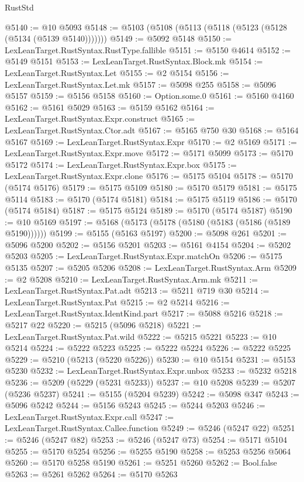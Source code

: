 \begin{lexlean}{RustStd}
\begin{coremodule}
@5140 := @10 @5093
@5148 := @5103 (@5108 (@5113 (@5118 (@5123 (@5128 (@5134 (@5139 @5140)))))))
@5149 := @5092 @5148
@5150 := LexLeanTarget.RustSyntax.RustType.fallible
@5151 := @5150 @4614
@5152 := @5149 @5151
@5153 := LexLeanTarget.RustSyntax.Block.mk
@5154 := LexLeanTarget.RustSyntax.Let
@5155 := @2 @5154
@5156 := LexLeanTarget.RustSyntax.Let.mk
@5157 := @5098 @255
@5158 := @5096 @5157
@5159 := @5156 @5158
@5160 := Option.some.{0}
@5161 := @5160 @4160
@5162 := @5161 @5029
@5163 := @5159 @5162
@5164 := LexLeanTarget.RustSyntax.Expr.construct
@5165 := LexLeanTarget.RustSyntax.Ctor.adt
@5167 := @5165 @750 @30
@5168 := @5164 @5167
@5169 := LexLeanTarget.RustSyntax.Expr
@5170 := @2 @5169
@5171 := LexLeanTarget.RustSyntax.Expr.move
@5172 := @5171 @5099
@5173 := @5170 @5172
@5174 := LexLeanTarget.RustSyntax.Expr.box
@5175 := LexLeanTarget.RustSyntax.Expr.clone
@5176 := @5175 @5104
@5178 := @5170 (@5174 @5176)
@5179 := @5175 @5109
@5180 := @5170 @5179
@5181 := @5175 @5114
@5183 := @5170 (@5174 @5181)
@5184 := @5175 @5119
@5186 := @5170 (@5174 @5184)
@5187 := @5175 @5124
@5189 := @5170 (@5174 @5187)
@5190 := @10 @5169
@5197 := @5168 (@5173 (@5178 (@5180 (@5183 (@5186 (@5189 @5190))))))
@5199 := @5155 (@5163 @5197)
@5200 := @5098 @261
@5201 := @5096 @5200
@5202 := @5156 @5201
@5203 := @5161 @4154
@5204 := @5202 @5203
@5205 := LexLeanTarget.RustSyntax.Expr.matchOn
@5206 := @5175 @5135
@5207 := @5205 @5206
@5208 := LexLeanTarget.RustSyntax.Arm
@5209 := @2 @5208
@5210 := LexLeanTarget.RustSyntax.Arm.mk
@5211 := LexLeanTarget.RustSyntax.Pat.adt
@5213 := @5211 @719 @30
@5214 := LexLeanTarget.RustSyntax.Pat
@5215 := @2 @5214
@5216 := LexLeanTarget.RustSyntax.IdentKind.part
@5217 := @5088 @5216
@5218 := @5217 @22
@5220 := @5215 (@5096 @5218)
@5221 := LexLeanTarget.RustSyntax.Pat.wild
@5222 := @5215 @5221
@5223 := @10 @5214
@5224 := @5222 @5223
@5225 := @5222 @5224
@5226 := @5222 @5225
@5229 := @5210 (@5213 (@5220 @5226))
@5230 := @10 @5154
@5231 := @5153 @5230
@5232 := LexLeanTarget.RustSyntax.Expr.unbox
@5233 := @5232 @5218
@5236 := @5209 (@5229 (@5231 @5233))
@5237 := @10 @5208
@5239 := @5207 (@5236 @5237)
@5241 := @5155 (@5204 @5239)
@5242 := @5098 @347
@5243 := @5096 @5242
@5244 := @5156 @5243
@5245 := @5244 @5203
@5246 := LexLeanTarget.RustSyntax.Expr.call
@5247 := LexLeanTarget.RustSyntax.Callee.function
@5249 := @5246 (@5247 @22)
@5251 := @5246 (@5247 @82)
@5253 := @5246 (@5247 @73)
@5254 := @5171 @5104
@5255 := @5170 @5254
@5256 := @5255 @5190
@5258 := @5253 @5256 @5064
@5260 := @5170 @5258 @5190
@5261 := @5251 @5260
@5262 := Bool.false
@5263 := @5261 @5262
@5264 := @5170 @5263

\end{coremodule}
\end{lexlean}
